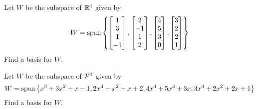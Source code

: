 \begin{applicationActivities}
\begin{activity}{10}
Let \(W\) be the subspace of \(\IR^4\) given by
 \[W = \vspan \left\{
 \begin{bmatrix} 1 \\ 3 \\ 1 \\ -1 \end{bmatrix},
 \begin{bmatrix} 2 \\ -1 \\ 1 \\ 2 \end{bmatrix},
 \begin{bmatrix} 4 \\ 5 \\ 3 \\ 0 \end{bmatrix},
 \begin{bmatrix} 3 \\ 2 \\ 2 \\ 1 \end{bmatrix}
 \right\} \]
 Find a basis for \(W\).
\end{activity}

\begin{activity}{10}
Let \(W\) be the subspace of \(\P^3\) given by
 \[W = \vspan \left\{x^3+3x^2+x-1, 2x^3-x^2+x+2, 4x^3+5x^3+3x, 3x^3+2x^2+2x+1 \right\} \]
 Find a basis for \(W\).
\end{activity}
\end{applicationActivities}
